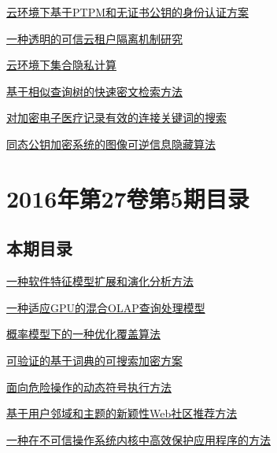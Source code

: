 \documentclass[a4paper]{article}
\begin{document}
\href{http://www.jos.org.cn/ch/reader/download_pdf.aspx?file_no=4992&year_id=2016&quarter_id=6&falg=1}{云环境下基于PTPM和无证书公钥的身份认证方案}

\href{http://www.jos.org.cn/ch/reader/download_pdf.aspx?file_no=4997&year_id=2016&quarter_id=6&falg=1}{一种透明的可信云租户隔离机制研究}

\href{http://www.jos.org.cn/ch/reader/download_pdf.aspx?file_no=4996&year_id=2016&quarter_id=6&falg=1}{云环境下集合隐私计算}

\href{http://www.jos.org.cn/ch/reader/download_pdf.aspx?file_no=4998&year_id=2016&quarter_id=6&falg=1}{基于相似查询树的快速密文检索方法}

\href{http://www.jos.org.cn/ch/reader/download_pdf.aspx?file_no=5005&year_id=2016&quarter_id=6&falg=1}{对加密电子医疗记录有效的连接关键词的搜索}

\href{http://www.jos.org.cn/ch/reader/download_pdf.aspx?file_no=5007&year_id=2016&quarter_id=6&falg=1}{同态公钥加密系统的图像可逆信息隐藏算法}


\section{\textbf{2016年第27卷第5期目录}}
\subsection{本期目录}
\href{http://www.jos.org.cn/ch/reader/download_pdf.aspx?file_no=4829&year_id=2016&quarter_id=5&falg=1}{一种软件特征模型扩展和演化分析方法}

\href{http://www.jos.org.cn/ch/reader/download_pdf.aspx?file_no=4828&year_id=2016&quarter_id=5&falg=1}{一种适应GPU的混合OLAP查询处理模型}

\href{http://www.jos.org.cn/ch/reader/download_pdf.aspx?file_no=4824&year_id=2016&quarter_id=5&falg=1}{概率模型下的一种优化覆盖算法}

\href{http://www.jos.org.cn/ch/reader/download_pdf.aspx?file_no=4912&year_id=2016&quarter_id=5&falg=1}{可验证的基于词典的可搜索加密方案}

\href{http://www.jos.org.cn/ch/reader/download_pdf.aspx?file_no=5027&year_id=2016&quarter_id=5&falg=1}{面向危险操作的动态符号执行方法}

\href{http://www.jos.org.cn/ch/reader/download_pdf.aspx?file_no=4882&year_id=2016&quarter_id=5&falg=1}{基于用户邻域和主题的新颖性Web社区推荐方法}

\href{http://www.jos.org.cn/ch/reader/download_pdf.aspx?file_no=5017&year_id=2016&quarter_id=5&falg=1}{一种在不可信操作系统内核中高效保护应用程序的方法}
\end{document}
